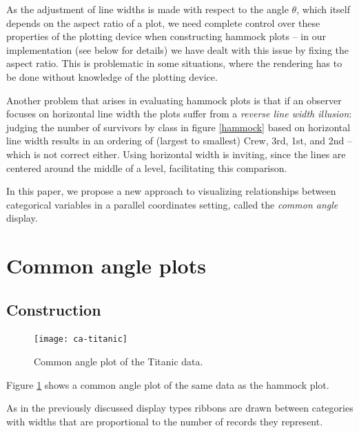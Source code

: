 As the adjustment of line widths is made with respect to the angle $\theta$, which itself depends on the aspect ratio of a plot, we need complete control over these properties of the plotting device when constructing hammock plots  -- in our implementation (see below for details) we have dealt with this issue by fixing the aspect ratio. This is problematic in some situations, where the rendering has to be done without knowledge of the plotting device. 

Another problem that arises in evaluating hammock plots is that if an observer focuses on horizontal line width  the plots suffer from a {\it reverse line width illusion}:  judging the number of survivors by class in figure \ref{hammock} based on horizontal line width  results in an ordering of (largest to smallest) Crew, 3rd, 1st, and 2nd -- which is not correct either. Using horizontal width is inviting, since the lines are centered around the middle of a level, facilitating this  comparison. 

In this paper, we propose a new approach to visualizing relationships between categorical variables in a parallel coordinates setting, called the {\it common angle} display. 


\section{ Common angle plots}
\subsection{Construction}


\begin{figure}[htbp] %
   \centering
   \texttt{[image: ca-titanic]} 
   \caption{ \label{fig:ca-titanic} Common angle plot of the Titanic data. }
  \end{figure}

Figure \ref{fig:ca-titanic} shows a common angle plot of the same data as the hammock plot.

As in the previously discussed display types ribbons are drawn between categories with widths  that are proportional to  the number of records they represent.

